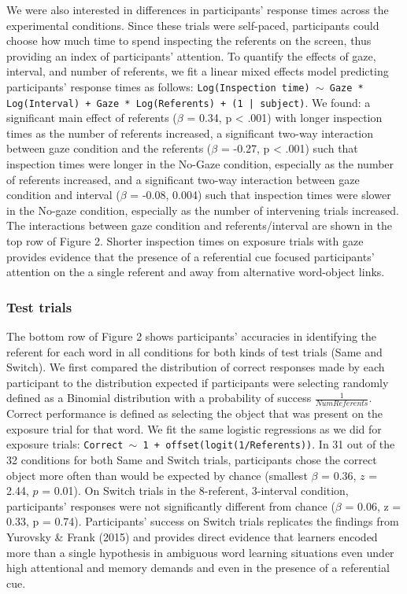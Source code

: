 \documentclass[authoryear, review]{elsarticle}
\begin{document}
We were also interested in differences in participants' response times
across the experimental conditions. Since these trials were self-paced,
participants could choose how much time to spend inspecting the
referents on the screen, thus providing an index of participants'
attention. To quantify the effects of gaze, interval, and number of
referents, we fit a linear mixed effects model predicting participants'
response times as follows:
\texttt{Log(Inspection time) $\sim$ Gaze * Log(Interval) + Gaze * Log(Referents) + (1 | subject)}.
We found: a significant main effect of referents (\(\beta\) = 0.34, p
\textless{} .001) with longer inspection times as the number of
referents increased, a significant two-way interaction between gaze
condition and the referents (\(\beta\) = -0.27, p \textless{} .001) such
that inspection times were longer in the No-Gaze condition, especially
as the number of referents increased, and a significant two-way
interaction between gaze condition and interval (\(\beta\) = -0.08,
0.004) such that inspection times were slower in the No-gaze condition,
especially as the number of intervening trials increased. The
interactions between gaze condition and referents/interval are shown in
the top row of Figure 2. Shorter inspection times on exposure trials
with gaze provides evidence that the presence of a referential cue
focused participants' attention on the a single referent and away from
alternative word-object links.

\subsubsection{Test trials}\label{test-trials}

The bottom row of Figure 2 shows participants' accuracies in identifying
the referent for each word in all conditions for both kinds of test
trials (Same and Switch). We first compared the distribution of correct
responses made by each participant to the distribution expected if
participants were selecting randomly defined as a Binomial distribution
with a probability of success \(\frac{1}{Num Referents}\). Correct
performance is defined as selecting the object that was present on the
exposure trial for that word. We fit the same logistic regressions as we
did for exposure trials:
\texttt{Correct $\sim$ 1 + offset(logit(1/Referents))}. In 31 out of the
32 conditions for both Same and Switch trials, participants chose the
correct object more often than would be expected by chance (smallest
\(\beta\) = 0.36, \(z\) = 2.44, \(p\) = 0.01). On Switch trials in the
8-referent, 3-interval condition, participants' responses were not
significantly different from chance (\(\beta\) = 0.06, z = 0.33, p =
0.74). Participants' success on Switch trials replicates the findings
from Yurovsky \& Frank (2015) and provides direct evidence that learners
encoded more than a single hypothesis in ambiguous word learning
situations even under high attentional and memory demands and even in
the presence of a referential cue.
\end{document}

